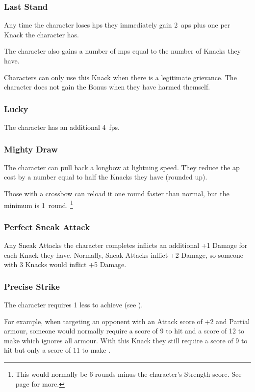 \begin{multicols}{2}
\subsubsection{Last Stand}

Any time the character loses \glspl{hp} they immediately gain 2~\glspl{ap} plus one per Knack the character has.

The character also gains a number of \glspl{mp} equal to the number of Knacks they have.

Characters can only use this Knack when there is a legitimate grievance.
The character does not gain the Bonus when they have harmed themself.

\subsubsection{Lucky}

The character has an additional 4~\glspl{fp}.

\subsubsection{Mighty Draw}

The character can pull back a longbow at lightning speed.
They reduce the \gls{ap} cost by a number equal to half the Knacks they have (rounded up).

Those with a crossbow can reload it one round faster than normal, but the minimum is 1~round.%
\footnote{This would normally be 6 rounds minus the character's Strength score. See page \pageref{crossbow} for more.}

\subsubsection{Perfect Sneak Attack}

Any Sneak Attacks the character completes inflicts an additional +1 Damage for each Knack they have.
Normally, Sneak Attacks inflict +2 Damage, so someone with 3 Knacks would inflict +5 Damage.

\subsubsection{Precise Strike}\label{precisestrike}

The character requires 1 less to achieve  (see ).

\begin{exampletext}
  For example, when targeting an opponent with an Attack score of +2 and Partial armour, someone would normally require a score of 9 to hit and a score of 12 to make  which ignores all armour.
  With this Knack they still require a score of 9 to hit but only a score of 11 to make .
\end{exampletext}


\end{multicols}
